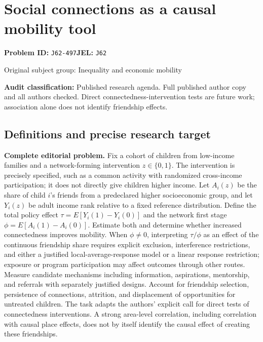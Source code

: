 \documentclass[11pt,a4paper]{article}
\begin{document}
\section*{Social connections as a causal mobility tool}
\textbf{Problem ID:} \texttt{J62-497}\quad \textbf{JEL:} \texttt{J62}\par
\label{problem:OP-0366}
{\sffamily\small\color{muted}Original subject group: Inequality and economic mobility\par}
\label{definitions:problem:30007648}
\textbf{Audit classification:} Published research agenda. Full published author copy and all authors checked. Direct connectedness-intervention tests are future work; association alone does not identify friendship effects.
\subsection*{Definitions and precise research target}
\textbf{Complete editorial problem.} Fix a cohort of children from low-income families and a network-forming intervention \(z\in\{0,1\}\). The intervention is precisely specified, such as a common activity with randomized cross-income participation; it does not directly give children higher income. Let \(A_i(z)\) be the share of child \(i\)'s friends from a predeclared higher socioeconomic group, and let \(Y_i(z)\) be adult income rank relative to a fixed reference distribution. Define the total policy effect \(\tau=E[Y_i(1)-Y_i(0)]\) and the network first stage \(\phi=E[A_i(1)-A_i(0)]\). Estimate both and determine whether increased connectedness improves mobility. When \(\phi\ne0\), interpreting \(\tau/\phi\) as an effect of the continuous friendship share requires explicit exclusion, interference restrictions, and either a justified local-average-response model or a linear response restriction; exposure or program participation may affect outcomes through other routes. Measure candidate mechanisms including information, aspirations, mentorship, and referrals with separately justified designs. Account for friendship selection, persistence of connections, attrition, and displacement of opportunities for untreated children. The task adapts the authors' explicit call for direct tests of connectedness interventions. A strong area-level correlation, including correlation with causal place effects, does not by itself identify the causal effect of creating these friendships.
\end{document}
